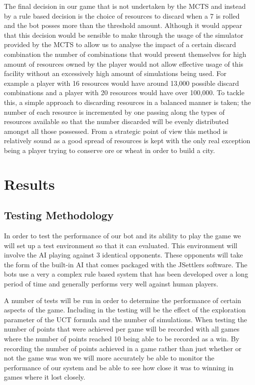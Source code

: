 \documentclass[]{article}
\let\oldsection\section
\renewcommand\section{\clearpage\oldsection}
\begin{document}
\par The final decision in our game that is not undertaken by the MCTS and instead by a rule based decision is the choice of resources to discard when a 7 is rolled and the bot posses more than the threshold amount. Although it would appear that this decision would be sensible to make through the usage of the simulator provided by the MCTS to allow us to analyse the impact of a certain discard combination the number of combinations that would present themselves for high amount of resources owned by the player would not allow effective usage of this facility without an excessively high amount of simulations being used. For example a player with 16 resources would have around 13,000 possible discard combinations and a player with 20 resources would have over 100,000. To tackle this, a simple approach to discarding resources in a balanced manner is taken; the number of each resource is incremented by one passing along the types of resources available so that the number discarded will be evenly distributed amongst all those possessed. From a strategic point of view this method is relatively sound as a good spread of resources is kept with the only real exception being a player trying to conserve ore or wheat in order to build a city.

\section{Results}

\subsection{Testing Methodology}
In order to test the performance of our bot and its ability to play the game we will set up a test environment so that it can evaluated. This environment will involve the AI playing against 3 identical opponents. These opponents will take the form of the built-in AI that comes packaged with the JSettlers software. The bots use a very a complex rule based system that has been developed over a long period of time and generally performs very well against human players. 

\par A number of tests will be run in order to determine the performance of certain aspects of the game. Including in the testing will be the effect of the exploration parameter of the UCT formula and the number of simulations. When testing the number of points that were achieved per game will be recorded with all games where the number of points reached 10 being able to be recorded as a win. By recording the number of points achieved in a game rather than just whether or not the game was won we will more accurately be able to monitor the performance of our system and be able to see how close it was to winning in games where it lost closely. 
\end{document}

